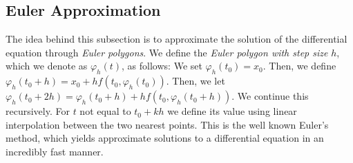 \documentclass[prb,12pt]{revtex4-2}
\theoremstyle{definition}
\theoremstyle{definition}
\theoremstyle{definition}
\begin{document}
	\subsection{Euler Approximation}
	The idea behind this subsection is to approximate the solution of the differential equation through \emph{Euler polygons}. We define the \emph{Euler polygon with step size} $h$, which we denote as $\varphi_h(t)$, as follows: We set $\varphi_h(t_0) = x_0$. Then, we define $\varphi_h(t_0+h)=x_0 + hf(t_0, \varphi_h(t_0))$. Then, we let $\varphi_h(t_0 + 2h)= \varphi_h(t_0+h)+hf(t_0, \varphi_h(t_0+h))$. We continue this recursively. For $t$ not equal to $t_0+kh$ we define its value using linear interpolation between the two nearest points. This is the well known Euler's method, which yields approximate solutions to a differential equation in an incredibly fast manner.
	
\end{document}

